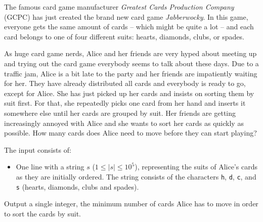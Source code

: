 
\newcommand{\name}{Jabberwocky}

%
The famous card game manufacturer \emph{Greatest Cards Production Company} (GCPC) has just created the brand new card game \emph{\name}.
In this game, everyone gets the same amount of cards -- which might be quite a lot -- and each card belongs to one of four different suits: hearts, diamonds, clubs, or spades.

As huge card game nerds, Alice and her friends are very hyped about meeting up and trying out the card game \mbox{everybody} seems to talk about these days.
Due to a \mbox{traffic} jam, Alice is a bit late to the party and her friends are \mbox{impatiently} waiting for her.
They have already distributed all cards and everybody is ready to go, except for Alice.
She has just picked up her cards and insists on sorting them by suit first.
For that, she repeatedly picks one card from her hand and inserts it somewhere else until her cards are grouped by suit.
Her friends are getting increasingly annoyed with Alice and she wants to sort her cards as quickly as possible.
How many cards does Alice need to move before they can start playing?

\begin{Input}
    The input consists of:
    \begin{itemize}
        \item One line with a string $s$ ($1\leq|s|\leq 10^5$), representing the suits of Alice's cards as they are initially ordered.
        The string consists of the characters \texttt{h}, \texttt{d}, \texttt{c}, and \texttt{s} (hearts, diamonds, clubs and spades).
    \end{itemize}
\end{Input}

\begin{Output}
    Output a single integer, the minimum number of cards Alice has to move in order to sort the cards by suit.
\end{Output}
